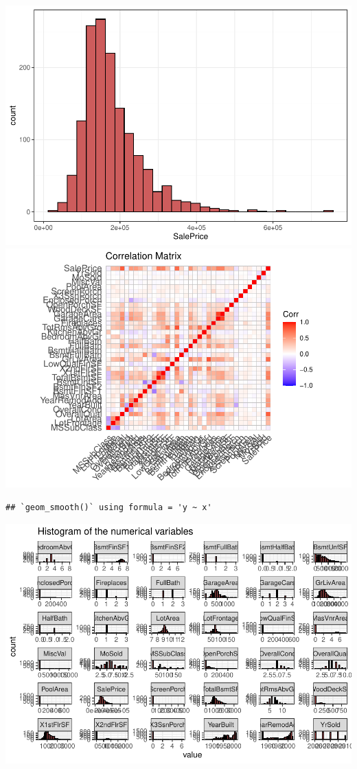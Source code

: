 \documentclass[
]{article}
\begin{document}
\includegraphics{report_files/figure-latex/numerical variables-1.pdf}
\includegraphics{report_files/figure-latex/numerical variables-2.pdf}

\begin{verbatim}
## `geom_smooth()` using formula = 'y ~ x'
\end{verbatim}

\includegraphics{report_files/figure-latex/numerical variables-3.pdf}
\end{document}
